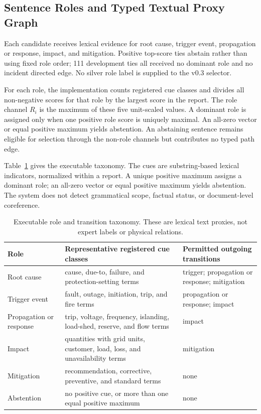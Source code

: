 \documentclass[applsci,article,submit,moreauthors]{Definitions/mdpi}
\begin{document}
\subsection{Sentence Roles and Typed Textual Proxy Graph}

Each candidate receives lexical evidence for root cause, trigger event, propagation or response, impact, and mitigation. Positive top-score ties abstain rather than using fixed role order; 111 development ties all received no dominant role and no incident directed edge. No silver role label is supplied to the v0.3 selector.

For each role, the implementation counts registered cue classes and divides all non-negative scores for that role by the largest score in the report. The role channel $R_i$ is the maximum of these five unit-scaled values. A dominant role is assigned only when one positive role score is uniquely maximal. An all-zero vector or equal positive maximum yields abstention. An abstaining sentence remains eligible for selection through the non-role channels but contributes no typed path edge.

Table~\ref{tab:taxonomy} gives the executable taxonomy. The cues are substring-based lexical indicators, normalized within a report. A unique positive maximum assigns a dominant role; an all-zero vector or equal positive maximum yields abstention. The system does not detect grammatical scope, factual status, or document-level coreference.

\begin{table}[H]
\caption{Executable role and transition taxonomy. These are lexical text proxies, not expert labels or physical relations.}
\label{tab:taxonomy}\centering\small
\begin{tabularx}{\textwidth}{p{2.2cm}XX}
\toprule
Role & Representative registered cue classes & Permitted outgoing transitions\\
\midrule
Root cause & cause, due-to, failure, and protection-setting terms & trigger; propagation or response; mitigation\\
Trigger event & fault, outage, initiation, trip, and fire terms & propagation or response; impact\\
Propagation or response & trip, voltage, frequency, islanding, load-shed, reserve, and flow terms & impact\\
Impact & quantities with grid units, customer, load, loss, and unavailability terms & mitigation\\
Mitigation & recommendation, corrective, preventive, and standard terms & none\\
Abstention & no positive cue, or more than one equal positive maximum & none\\
\bottomrule
\end{tabularx}
\end{table}
\end{document}

